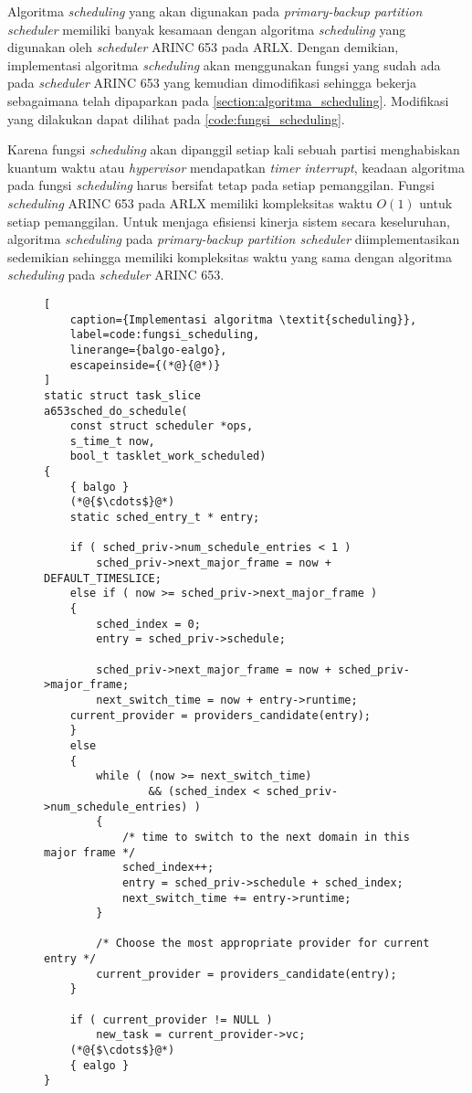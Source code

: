Algoritma \textit{scheduling} yang akan digunakan pada \textit{primary-backup partition
scheduler} memiliki banyak kesamaan dengan algoritma \textit{scheduling} yang digunakan oleh
\textit{scheduler} ARINC 653 pada ARLX. Dengan demikian, implementasi algoritma
\textit{scheduling} akan menggunakan fungsi yang sudah ada pada \textit{scheduler} ARINC 653
yang kemudian dimodifikasi sehingga bekerja sebagaimana telah dipaparkan pada
\autoref{section:algoritma_scheduling}. Modifikasi yang dilakukan dapat dilihat pada
\autoref{code:fungsi_scheduling}.

Karena fungsi \textit{scheduling} akan dipanggil setiap kali sebuah partisi menghabiskan kuantum
waktu atau \textit{hypervisor} mendapatkan \textit{timer interrupt}, keadaan algoritma pada
fungsi \textit{scheduling} harus bersifat tetap pada setiap pemanggilan. Fungsi
\textit{scheduling} ARINC 653 pada ARLX memiliki kompleksitas waktu $O(1)$ untuk setiap
pemanggilan. Untuk menjaga efisiensi kinerja sistem secara keseluruhan, algoritma
\textit{scheduling} pada \textit{primary-backup partition scheduler} diimplementasikan
sedemikian sehingga memiliki kompleksitas waktu yang sama dengan algoritma \textit{scheduling}
pada \textit{scheduler} ARINC 653.

\begin{figure}
\begin{lstlisting}[
	caption={Implementasi algoritma \textit{scheduling}},
	label=code:fungsi_scheduling,
	linerange={balgo-ealgo},
	escapeinside={(*@}{@*)}
]
static struct task_slice
a653sched_do_schedule(
    const struct scheduler *ops,
    s_time_t now,
    bool_t tasklet_work_scheduled)
{
    { balgo }
    (*@{$\cdots$}@*)
    static sched_entry_t * entry;

    if ( sched_priv->num_schedule_entries < 1 )
        sched_priv->next_major_frame = now + DEFAULT_TIMESLICE;
    else if ( now >= sched_priv->next_major_frame )
    {
        sched_index = 0;
        entry = sched_priv->schedule;

        sched_priv->next_major_frame = now + sched_priv->major_frame;
        next_switch_time = now + entry->runtime;
	current_provider = providers_candidate(entry);
    }
    else
    {
        while ( (now >= next_switch_time)
                && (sched_index < sched_priv->num_schedule_entries) )
        {
            /* time to switch to the next domain in this major frame */
            sched_index++;
            entry = sched_priv->schedule + sched_index;
            next_switch_time += entry->runtime;
        }

        /* Choose the most appropriate provider for current entry */
        current_provider = providers_candidate(entry);
    }

    if ( current_provider != NULL )
        new_task = current_provider->vc;
    (*@{$\cdots$}@*)
    { ealgo }
}
\end{lstlisting}
\end{figure}


